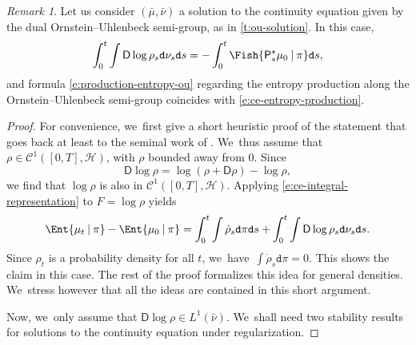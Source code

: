 \documentclass[10pt]{amsart}
\theoremstyle{definition}
\theoremstyle{remark}
\newtheorem{remark}[theorem]{Remark}
\newcommand{\given}[1][]{%
\nonscript\:#1\vert
\allowbreak
\nonscript\:
\mathopen{}}
\begin{document}
\begin{remark}\label{r:EntropyProdAlongOU}
Let us consider $(\bar{\mu}, \bar{\nu})$ a solution to the continuity equation given by the dual Ornstein--Uhlenbeck semi-group, as in \cref{t:ou-solution}.
In this case,
\begin{equation*}
\int_{0}^{t} \int \mathsf{D} \log \rho_{s} \mathtt{d} \nu_{s} \mathtt{d} s = - \int_{0}^{t} \Fish{ \mathsf{P}^{\star}_{s} \mu_{0} \given \pi } \mathtt{d} s,
\end{equation*}
and formula \cref{e:production-entropy-ou} regarding the entropy production along the Ornstein--Uhlenbeck semi-group coincides with \cref{e:ce-entropy-production}.
\end{remark}

\begin{proof}
For convenience, we~first give a short heuristic proof of the statement that goes back at least to the seminal work of \cite{OttoVillani}. We~thus assume that $\rho \in \mathscr{C}^{1}([0,T], \mathscr{H})$, with $\rho$ bounded away from $0$.
Since
\begin{equation*}
\mathsf{D} \log \rho = \log (\rho + \mathsf{D} \rho) - \log \rho,
\end{equation*}
we find that $\log \rho$ is also in $\mathscr{C}^{1}([0,T], \mathscr{H})$.
Applying \cref{e:ce-integral-representation} to $F = \log \rho$ yields
\begin{equation*}
\Ent{ \mu_{t} \given \pi } - \Ent{ \mu_{0} \given \pi } = \int_{0}^{t} \int \dot{\rho}_{s} \mathtt{d} \pi \mathtt{d} s + \int_{0}^{t} \int \mathsf{D} \log \rho_{s} \mathtt{d} \nu_{s} \mathtt{d} s.
\end{equation*}
Since $\rho_{t}$ is a probability density for all $t$, we~have~$\int \dot{\rho}_{s} \mathtt{d} \pi = 0$.
This shows the claim in this case.
The rest of the proof formalizes this idea for general densities. We~stress however that all the ideas are contained in this short argument.

Now, we~only assume that $\mathsf{D} \log \rho \in L^{1}(\bar{\nu})$. We~shall need two stability results for solutions to the continuity equation under regularization.

\end{proof}
\end{document}
